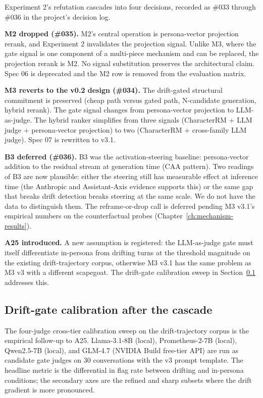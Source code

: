 Experiment 2's refutation cascades into four decisions, recorded as \#033 through \#036 in the project's decision log.

\textbf{M2 dropped (\#035).} M2's central operation is persona-vector projection rerank, and Experiment 2 invalidates the projection signal. Unlike M3, where the gate signal is one component of a multi-piece mechanism and can be replaced, the projection rerank is M2. No signal substitution preserves the architectural claim. Spec 06 is deprecated and the M2 row is removed from the evaluation matrix.

\textbf{M3 reverts to the v0.2 design (\#034).} The drift-gated structural commitment is preserved (cheap path versus gated path, N-candidate generation, hybrid rerank). The gate signal changes from persona-vector projection to LLM-as-judge. The hybrid ranker simplifies from three signals (CharacterRM + LLM judge + persona-vector projection) to two (CharacterRM + cross-family LLM judge). Spec 07 is rewritten to v3.1.

\textbf{B3 deferred (\#036).} B3 was the activation-steering baseline: persona-vector addition to the residual stream at generation time (CAA pattern\autocite{caa2023, repe2023}). Two readings of B3 are now plausible: either the steering still has measurable effect at inference time (the Anthropic and Assistant-Axis evidence supports this) or the same gap that breaks drift detection breaks steering at the same scale. We do not have the data to distinguish them. The reframe-or-drop call is deferred pending M3 v3.1's empirical numbers on the counterfactual probes (Chapter~\ref{ch:mechanism-results}).

\textbf{A25 introduced.} A new assumption is registered: the LLM-as-judge gate must itself differentiate in-persona from drifting turns at the threshold magnitude on the existing drift-trajectory corpus, otherwise M3 v3.1 has the same problem as M3 v3 with a different scapegoat. The drift-gate calibration sweep in Section~\ref{sec:experiment-2-architecture-fixed} addresses this.

\subsection{Drift-gate calibration after the cascade}
\label{sec:experiment-2-architecture-fixed}

The four-judge cross-tier calibration sweep on the drift-trajectory corpus is the empirical follow-up to A25. Llama-3.1-8B (local), Prometheus-2-7B (local), Qwen2.5-7B (local), and GLM-4.7 (NVIDIA Build free-tier API) are run as candidate gate judges on 30 conversations with the v3 prompt template. The headline metric is the differential in flag rate between drifting and in-persona conditions; the secondary axes are the refined and sharp subsets where the drift gradient is more pronounced.

